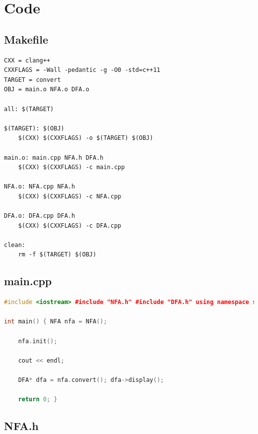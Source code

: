 \documentclass{article}
\begin{document}
\pagebreak

\section*{Code}

\subsection*{Makefile}

\begin{lstlisting}
CXX = clang++
CXXFLAGS = -Wall -pedantic -g -O0 -std=c++11
TARGET = convert
OBJ = main.o NFA.o DFA.o

all: $(TARGET)

$(TARGET): $(OBJ)
	$(CXX) $(CXXFLAGS) -o $(TARGET) $(OBJ)

main.o: main.cpp NFA.h DFA.h
	$(CXX) $(CXXFLAGS) -c main.cpp

NFA.o: NFA.cpp NFA.h
	$(CXX) $(CXXFLAGS) -c NFA.cpp

DFA.o: DFA.cpp DFA.h
	$(CXX) $(CXXFLAGS) -c DFA.cpp

clean:
	rm -f $(TARGET) $(OBJ)
\end{lstlisting}

\subsection*{main.cpp}

\begin{lstlisting}[language=C++]
#include <iostream> #include "NFA.h" #include "DFA.h" using namespace std;

int main() { NFA nfa = NFA();

	nfa.init();

	cout << endl;

	DFA* dfa = nfa.convert(); dfa->display();

	return 0; }
\end{lstlisting}

\newpage

\subsection*{NFA.h}
\end{document}
